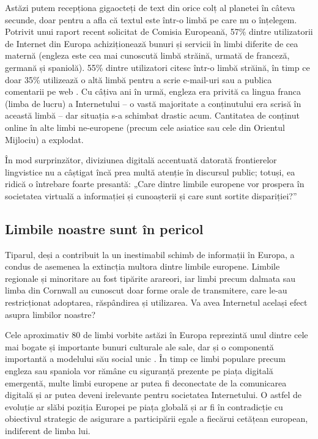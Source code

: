 \begin{multicols}{2}
Astăzi putem recepționa gigaocteți de text din orice colț al planetei în câteva secunde, doar pentru a afla că textul este \mbox{într-o} limbă pe care nu o înțelegem. Potrivit unui raport recent solicitat de Comisia Europeană, 57\% dintre utilizatorii de Internet din Europa achiziționează bunuri și servicii în limbi diferite de cea maternă (engleza este cea mai cunoscută limbă străină, urmată de franceză, germană și spaniolă). 55\% dintre utilizatori citesc \mbox{într-o} limbă străină, în timp ce doar 35\% utilizează o altă limbă pentru a scrie e-mail-uri sau a publica comentarii pe web \cite{EC1}. Cu câțiva ani în urmă, engleza era privită ca lingua franca (limba de lucru) a Internetului -- o vastă majoritate a conținutului era scrisă în această limbă -- dar situația s-a schimbat drastic acum. Cantitatea de conținut online în alte limbi ne-europene (precum cele asiatice sau cele din Orientul Mijlociu) a explodat.

În mod surprinzător, diviziunea digitală accentuată datorată frontierelor lingvistice nu a câștigat încă prea multă atenție în discursul public; totuși, ea ridică o întrebare foarte presantă: „Care dintre limbile europene vor prospera în societatea virtuală a informației și cunoașterii și care sunt sortite dispariției?”

\subsection{Limbile noastre sunt în pericol}

Tiparul, deși a contribuit la un inestimabil schimb de informații în Europa, a condus de asemenea la extincția multora dintre limbile europene. Limbile regionale și minoritare au fost tipărite arareori, iar limbi precum dalmata sau limba din Cornwall au cunoscut doar forme orale de transmitere, care le-au restricționat adoptarea, răspândirea și utilizarea. Va avea Internetul același efect asupra limbilor noastre?

Cele aproximativ 80 de limbi vorbite astăzi în Europa reprezintă unul dintre cele mai bogate și importante bunuri culturale ale sale, dar și o componentă importantă a modelului său social unic \cite{EC2}. În timp ce limbi populare precum engleza sau spaniola vor rămâne cu siguranță prezente pe piața digitală emergentă, multe limbi europene ar putea fi deconectate de la comunicarea digitală și ar putea deveni irelevante pentru societatea Internetului. O astfel de evoluție ar slăbi poziția Europei pe piața globală și ar fi în contradicție cu obiectivul strategic de asigurare a participării egale a fiecărui cetățean european, indiferent de limba lui. 


\end{multicols}

